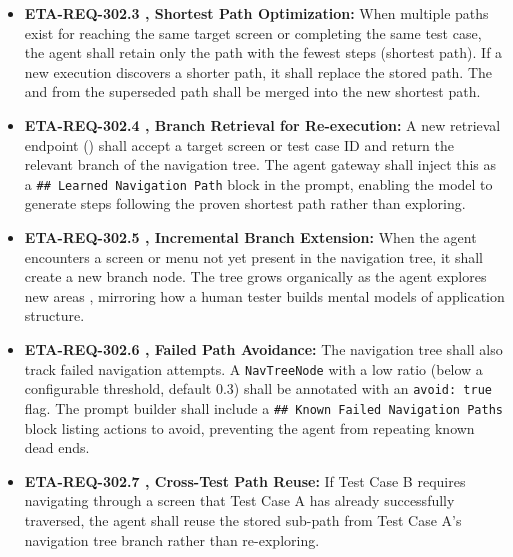 \begin{itemize}[leftmargin=1.4em,itemsep=1pt,topsep=3pt]
  \item \textbf{ETA-REQ-302.3 ,  Shortest Path Optimization:} When multiple paths exist for reaching the same target screen or completing the same test case, the agent shall retain only the path with the fewest steps (shortest path). If a new execution discovers a shorter path, it shall replace the stored path. The  and  from the superseded path shall be merged into the new shortest path.
\end{itemize}

\begin{itemize}[leftmargin=1.4em,itemsep=1pt,topsep=3pt]
  \item \textbf{ETA-REQ-302.4 ,  Branch Retrieval for Re-execution:} A new retrieval endpoint () shall accept a target screen or test case ID and return the relevant branch of the navigation tree. The agent gateway shall inject this as a \texttt{\#\# Learned Navigation Path} block in the prompt, enabling the model to generate steps following the proven shortest path rather than exploring.
\end{itemize}

\begin{itemize}[leftmargin=1.4em,itemsep=1pt,topsep=3pt]
  \item \textbf{ETA-REQ-302.5 ,  Incremental Branch Extension:} When the agent encounters a screen or menu not yet present in the navigation tree, it shall create a new branch node. The tree grows organically as the agent explores new areas ,  mirroring how a human tester builds mental models of application structure.
\end{itemize}

\begin{itemize}[leftmargin=1.4em,itemsep=1pt,topsep=3pt]
  \item \textbf{ETA-REQ-302.6 ,  Failed Path Avoidance:} The navigation tree shall also track failed navigation attempts. A \texttt{NavTreeNode} with a low  ratio (below a configurable threshold, default 0.3) shall be annotated with an \texttt{avoid: true} flag. The prompt builder shall include a \texttt{\#\# Known Failed Navigation Paths} block listing actions to avoid, preventing the agent from repeating known dead ends.
\end{itemize}

\begin{itemize}[leftmargin=1.4em,itemsep=1pt,topsep=3pt]
  \item \textbf{ETA-REQ-302.7 ,  Cross-Test Path Reuse:} If Test Case B requires navigating through a screen that Test Case A has already successfully traversed, the agent shall reuse the stored sub-path from Test Case A's navigation tree branch rather than re-exploring.
\end{itemize}

